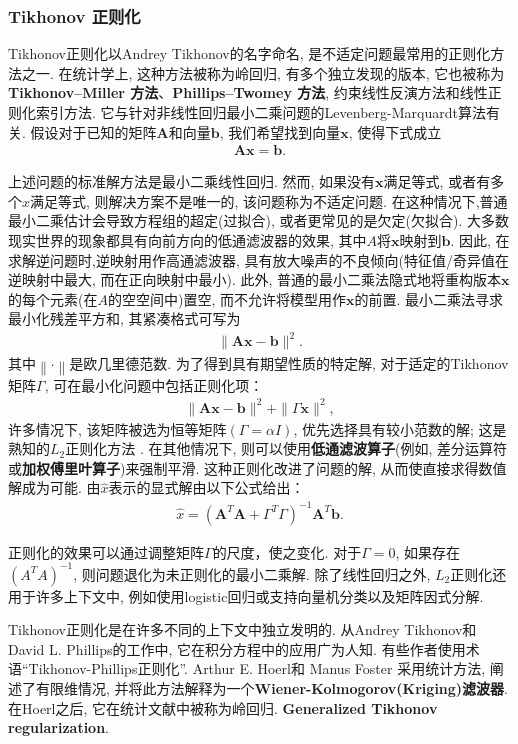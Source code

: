 \subsubsection{Tikhonov 正则化}
Tikhonov正则化以Andrey Tikhonov的名字命名, 是不适定问题最常用的正则化方法之一.
在统计学上, 这种方法被称为岭回归, 有多个独立发现的版本, 它也被称为\textbf{Tikhonov–Miller 方法}、\textbf{Phillips–Twomey 方法}, 约束线性反演方法和线性正则化索引方法. 
它与针对非线性回归最小二乘问题的Levenberg-Marquardt算法有关.
假设对于已知的矩阵$\bm A$和向量$\bm b$, 我们希望找到向量$\bm{x}$, 使得下式成立
\begin{align}
    \bm A\bm {x} =\bm {b}.
\end{align}

上述问题的标准解方法是最小二乘线性回归. 然而, 如果没有$\bm x$满足等式, 或者有多个$\displaystyle x$满足等式, 则解决方案不是唯一的, 该问题称为不适定问题.
在这种情况下,普通最小二乘估计会导致方程组的超定(过拟合), 或者更常见的是欠定(欠拟合).
大多数现实世界的现象都具有向前方向的低通滤波器的效果, 其中$A$将$\bm{x}$映射到$\bm{b}$.
因此, 在求解逆问题时,逆映射用作高通滤波器, 具有放大噪声的不良倾向(特征值/奇异值在逆映射中最大, 而在正向映射中最小).
此外, 普通的最小二乘法隐式地将重构版本$\bm{x}$的每个元素(在$A$的空空间中)置空, 而不允许将模型用作$\bm{x}$的前置.
最小二乘法寻求最小化残差平方和, 其紧凑格式可写为
\begin{align}
    \|\bm A\bm {x} -\bm {b} \|^{2}.
\end{align}
其中$\left\|\cdot\right\|$是欧几里德范数. 为了得到具有期望性质的特定解, 对于适定的Tikhonov矩阵$\Gamma$, 可在最小化问题中包括正则化项：
\begin{align}
    \|\bm A\bm {x} -\bm {b} \|^{2}+\|\Gamma \bm {x} \|^{2},
\end{align}
许多情况下, 该矩阵被选为恒等矩阵$(\Gamma=\alpha I)$, 优先选择具有较小范数的解; 这是熟知的$L_2$正则化方法 \cite{Ng2004-32636}.
在其他情况下, 则可以使用\textbf{低通滤波算子}(例如, 差分运算符或\textbf{加权傅里叶算子})来强制平滑.
这种正则化改进了问题的解, 从而使直接求得数值解成为可能. 由$\hat{x}$表示的显式解由以下公式给出：
\begin{align}
    {\hat {x}}=(\bm A^{T}\bm A+\Gamma ^{T}\Gamma )^{-1}\bm A^{T}\bm {b}.
\end{align}

正则化的效果可以通过调整矩阵$\Gamma$的尺度，使之变化. 对于$\Gamma=0$, 如果存在$(A^TA)^{-1}$, 则问题退化为未正则化的最小二乘解.
除了线性回归之外, $L_2$正则化还用于许多上下文中, 例如使用logistic回归或支持向量机分类\cite{Fan2008LIBLINEAR}以及矩阵因式分解\cite{Guan2012Online}.
\begin{remark}
Tikhonov正则化是在许多不同的上下文中独立发明的. 从Andrey Tikhonov和David L. Phillips的工作中, 它在积分方程中的应用广为人知.
有些作者使用术语“Tikhonov-Phillips正则化”. Arthur E. Hoerl和 Manus Foster 采用统计方法, 阐述了有限维情况, 并将此方法解释为一个\textbf{Wiener-Kolmogorov(Kriging)滤波器}.
在Hoerl之后, 它在统计文献中被称为岭回归. \textbf{Generalized Tikhonov regularization}.
\end{remark}

